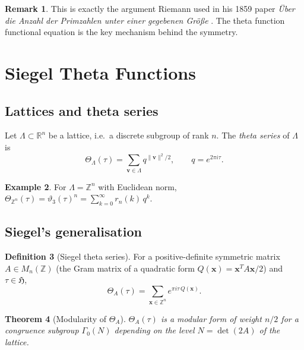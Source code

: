 \documentclass[12pt,a4paper]{amsart}
\newtheorem{theorem}{Theorem}[section]
\theoremstyle{definition}
\newtheorem{definition}[theorem]{Definition}
\newtheorem{example}[theorem]{Example}
\newtheorem{remark}[theorem]{Remark}
\begin{document}
\begin{remark}
This is exactly the argument Riemann used in his 1859 paper
\textit{\"Uber die Anzahl der Primzahlen unter einer gegebenen Gr\"o\ss e} \cite{Riemann1859}.
The theta function functional equation is the key mechanism behind the symmetry.
\end{remark}

\section{Siegel Theta Functions}\label{sec:siegel}

\subsection{Lattices and theta series}

Let $\Lambda \subset \mathbb{R}^n$ be a lattice, i.e.\ a discrete subgroup of rank $n$.
The \emph{theta series} of $\Lambda$ is
\[
  \Theta_\Lambda(\tau) = \sum_{\mathbf{v} \in \Lambda} q^{\|\mathbf{v}\|^2/2},
  \qquad q = e^{2\pi i\tau}.
\]

\begin{example}
For $\Lambda = \mathbb{Z}^n$ with Euclidean norm,
$\Theta_{\mathbb{Z}^n}(\tau) = \vartheta_3(\tau)^n = \sum_{k=0}^\infty r_n(k)\, q^k$.
\end{example}

\subsection{Siegel's generalisation}

\begin{definition}[Siegel theta series]\label{def:siegel_theta}
For a positive-definite symmetric matrix $A \in M_n(\mathbb{Z})$ (the Gram matrix
of a quadratic form $Q(\mathbf{x}) = \mathbf{x}^T A \mathbf{x} / 2$) and
$\tau \in \mathfrak{H}$,
\[
  \Theta_A(\tau) = \sum_{\mathbf{x} \in \mathbb{Z}^n} e^{\pi i \tau\, Q(\mathbf{x})}.
\]
\end{definition}

\begin{theorem}[Modularity of $\Theta_A$]\label{thm:siegel_modular}
$\Theta_A(\tau)$ is a modular form of weight $n/2$ for a congruence subgroup
$\Gamma_0(N)$ depending on the level $N = \det(2A)$ of the lattice.
\end{theorem}
\end{document}
